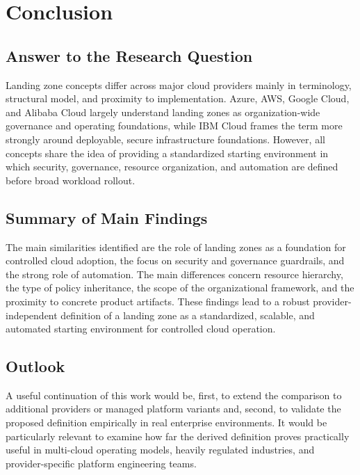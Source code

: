 \section{Conclusion}
\label{sec:abschluss}


\subsection{Answer to the Research Question}

Landing zone concepts differ across major cloud providers mainly in terminology, structural model, and proximity to implementation. Azure, AWS, Google Cloud, and Alibaba Cloud largely understand landing zones as organization-wide governance and operating foundations, while IBM Cloud frames the term more strongly around deployable, secure infrastructure foundations. However, all concepts share the idea of providing a standardized starting environment in which security, governance, resource organization, and automation are defined before broad workload rollout.

\subsection{Summary of Main Findings}

The main similarities identified are the role of landing zones as a foundation for controlled cloud adoption, the focus on security and governance guardrails, and the strong role of automation. The main differences concern resource hierarchy, the type of policy inheritance, the scope of the organizational framework, and the proximity to concrete product artifacts. These findings lead to a robust provider-independent definition of a landing zone as a standardized, scalable, and automated starting environment for controlled cloud operation.

\subsection{Outlook}

A useful continuation of this work would be, first, to extend the comparison to additional providers or managed platform variants and, second, to validate the proposed definition empirically in real enterprise environments. It would be particularly relevant to examine how far the derived definition proves practically useful in multi-cloud operating models, heavily regulated industries, and provider-specific platform engineering teams.
